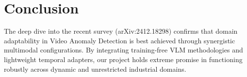\documentclass[12pt, a4paper]{article}
\begin{document}
\section{Conclusion}
The deep dive into the recent survey (arXiv:2412.18298) confirms that domain adaptability in Video Anomaly Detection is best achieved through synergistic multimodal configurations. By integrating training-free VLM methodologies and lightweight temporal adapters, our project holds extreme promise in functioning robustly across dynamic and unrestricted industrial domains.
\end{document}
